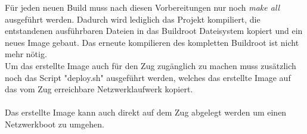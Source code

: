 Für jeden neuen Build muss nach diesen Vorbereitungen nur noch \textit{make all} ausgeführt werden. Dadurch wird lediglich das Projekt kompiliert, die entstandenen ausführbaren Dateien in das Buildroot Dateisystem kopiert und ein neues Image gebaut. Das erneute kompilieren des kompletten Buildroot ist nicht mehr nötig.\\
Um das erstellte Image auch für den Zug zugänglich zu machen muss zusätzlich noch das Script "deploy.sh" ausgeführt werden, welches das erstellte Image auf das vom Zug erreichbare Netzwerklaufwerk kopiert.\\\\
Das erstellte Image kann auch direkt auf dem Zug abgelegt werden um einen Netzwerkboot zu umgehen.
